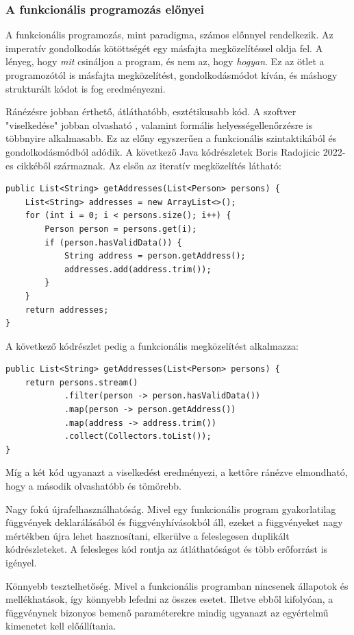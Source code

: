\documentclass[12pt]{article}
\begin{document}
\subsubsection{A funkcionális programozás előnyei}
A funkcionális programozás, mint paradigma, számos előnnyel rendelkezik. Az imperatív gondolkodás kötöttségét egy másfajta megközelítéssel oldja fel. A lényeg, hogy \textit{mit} csináljon a program, és nem az, hogy \textit{hogyan}. Ez az ötlet a programozótól is  másfajta megközelítést, gondolkodásmódot kíván, és máshogy strukturált kódot is fog eredményezni. 

Ránézésre jobban érthető, átláthatóbb, esztétikusabb kód. A szoftver "viselkedése" jobban olvasható \cite{CS}, valamint formális helyességellenőrzésre is többnyire alkalmasabb. Ez az előny egyszerűen a funkcionális szintaktikából és gondolkodásmódból adódik. A következő Java kódrészletek Boris Radojicic 2022-es cikkéből \cite{sy} származnak. Az elsőn az iteratív megközelítés látható:

\begin{verbatim}
public List<String> getAddresses(List<Person> persons) {
    List<String> addresses = new ArrayList<>();
    for (int i = 0; i < persons.size(); i++) {
        Person person = persons.get(i);
        if (person.hasValidData()) {
            String address = person.getAddress();
            addresses.add(address.trim());
        }
    }
    return addresses;
}
\end{verbatim}
A következő kódrészlet pedig a funkcionális megközelítést alkalmazza:
\begin{verbatim}
public List<String> getAddresses(List<Person> persons) {
    return persons.stream()
            .filter(person -> person.hasValidData())
            .map(person -> person.getAddress())
            .map(address -> address.trim())
            .collect(Collectors.toList());
}
\end{verbatim}
Míg a két kód ugyanazt a viselkedést eredményezi, a kettőre ránézve elmondható, hogy a második olvashatóbb és tömörebb.

Nagy fokú újrafelhasználhatóság. Mivel egy funkcionális program gyakorlatilag függvények deklarálásából és függvényhívásokból áll, ezeket a függvényeket nagy mértékben újra lehet hasznosítani, elkerülve a feleslegesen duplikált kódrészleteket. A felesleges kód rontja az átláthatóságot és több erőforrást is igényel.

Könnyebb tesztelhetőség. Mivel a funkcionális programban nincsenek állapotok és mellékhatások, így könnyebb lefedni az összes esetet. Illetve ebből kifolyóan, a függvénynek bizonyos bemenő paraméterekre mindig ugyanazt az egyértelmű kimenetet kell előállítania.
\end{document}
